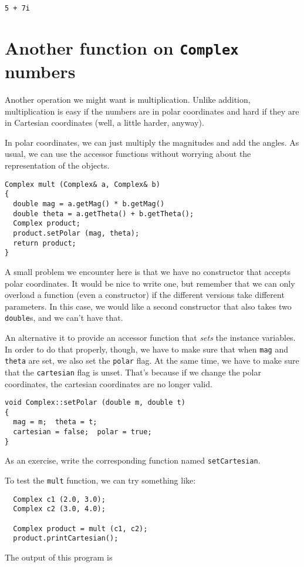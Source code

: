 \begin{lstlisting}
5 + 7i
\end{lstlisting}
%


\section{Another function on {\tt Complex} numbers}

Another operation we might want is multiplication.  Unlike
addition, multiplication is easy if the numbers are in polar
coordinates and hard if they are in Cartesian coordinates
(well, a little harder, anyway).

In polar coordinates, we can just multiply the magnitudes and
add the angles.  As usual, we can use the accessor functions
without worrying about the representation of the objects.

\begin{lstlisting}
Complex mult (Complex& a, Complex& b)
{
  double mag = a.getMag() * b.getMag()
  double theta = a.getTheta() + b.getTheta();
  Complex product;
  product.setPolar (mag, theta);
  return product;
}
\end{lstlisting}
%
A small problem we encounter here is that we have no constructor
that accepts polar coordinates.  It would be nice to write one,
but remember that we can only overload a function (even a
constructor) if the different versions take different parameters.
In this case, we would like a second constructor that also takes
two {\tt double}s, and we can't have that.

An alternative it to provide an accessor function that {\em sets}
the instance variables.  In order to do that properly, though,
we have to make sure that when {\tt mag} and {\tt theta} are set,
we also set the {\tt polar} flag.  At the same time, we have to
make sure that the {\tt cartesian} flag is unset.  That's because
if we change the polar coordinates, the cartesian coordinates are
no longer valid.

\begin{lstlisting}
void Complex::setPolar (double m, double t)
{
  mag = m;  theta = t;
  cartesian = false;  polar = true;
}
\end{lstlisting}
%
As an exercise, write the corresponding function named
{\tt setCartesian}.

To test the {\tt mult} function, we can try something like:

\begin{lstlisting}
  Complex c1 (2.0, 3.0);
  Complex c2 (3.0, 4.0);

  Complex product = mult (c1, c2);
  product.printCartesian();
\end{lstlisting}
%
The output of this program is

